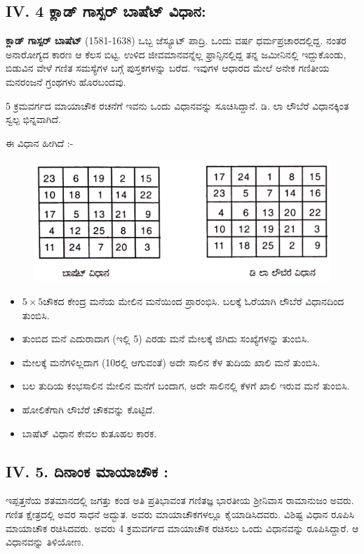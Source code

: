 \subsection{IV. 4 ಕ್ಲಾಡ್ ಗಾಸ್ಪರ್ ಬಾಷೆಟ್ ವಿಧಾನ:}

\textbf{ಕ್ಲಾಡ್ ಗಾಸ್ಪರ್ ಬಾಷೆಟ್} (1581-1638) ಒಬ್ಬ ಜೆಸ್ಯೂಟ್ ಪಾದ್ರಿ. ಒಂದು ವರ್ಷ ಧರ್ಮಪ್ರಚಾರದಲ್ಲಿದ್ದ. ನಂತರ ಅನಾರೋಗ್ಯದ ಕಾರಣ ಆ ಕೆಲಸ ಬಿಟ್ಟ. ಉಳಿದ ಜೀವಮಾನವನ್ನೆಲ್ಲ ಫ್ರಾನ್ಸಿನಲ್ಲಿದ್ದ ತನ್ನ ಜಮೀನಿನಲ್ಲಿ ಇದ್ದುಕೊಂಡು, ಬಿಡುವಿನ ವೇಳೆ ಗಣಿತ ಸಮಸ್ಯೆಗಳ ಬಗ್ಗೆ ಪುಸ್ತಕಗಳನ್ನು ಬರೆದ. ಇವುಗಳ ಆಧಾರದ ಮೇಲೆ ಅನೇಕ ಗಣಿತೀಯ ಮನರಂಜನೆ ಗ್ರಂಥಗಳು ಹೊರಬಂದವು.

5 ಕ್ರಮವರ್ಗದ ಮಾಯಾಚೌಕ ರಚನೆಗೆ ಇವನು ಒಂದು ವಿಧಾನವನ್ನು ಸೂಚಿಸಿದ್ದಾನೆ. ಡಿ. ಲಾ ಲೌಬೆರೆ ವಿಧಾನಕ್ಕಿಂತ ಸ್ವಲ್ಪ ಭಿನ್ನವಾಗಿದೆ.

ಈ ವಿಧಾನ ಹೀಗಿದೆ :-
\begin{figure}[h]
\includegraphics{src/figures/chap3/fig3.43.jpg}
\end{figure}

\begin{itemize}
	\item $5 \times 5$ಚೌಕದ ಕೇಂದ್ರ ಮನೆಯ ಮೇಲಿನ ಮನೆಯಿಂದ ಪ್ರಾರಂಭಿಸಿ. ಬಲಕ್ಕೆ ಓರೆಯಾಗಿ ಲೌಬೆರೆ ವಿಧಾನದಿಂದ ತುಂಬಿಸಿ.
	\item ತುಂಬಿದ ಮನೆ ಎದುರಾದಾಗ (ಇಲ್ಲಿ 5) ಎರಡು ಮನೆ ಮೇಲಕ್ಕೆ ಜಿಗಿದು ಸಂಖ್ಯೆಗಳನ್ನು ತುಂಬಿಸಿ.
	\item ಮೇಲಕ್ಕೆ ಮನೆಗಳಿಲ್ಲದಾಗ (10ರಲ್ಲಿ ಆಗುವಂತೆ) ಅದೇ ಸಾಲಿನ ಕೆಳ ತುದಿಯ ಖಾಲಿ ಮನೆ ತುಂಬಿಸಿ.
	\item ಬಲ ತುದಿಯ ಕಂಭಸಾಲಿನ ಮೇಲಿನ ಮನೆಗೆ ಬಂದಾಗ, ಅದೇ ಸಾಲಿನಲ್ಲಿ ಕೆಳಗೆ ಖಾಲಿ ಇರುವ ಮನೆ ತುಂಬಿಸಿ.
	\item ಹೋಲಿಕೆಗಾಗಿ ಲೌಬೆರೆ ಚೌಕವನ್ನು ಕೊಟ್ಟಿದೆ.
	\item ಬಾಷೆಟ್ ವಿಧಾನ ಕೇವಲ ಕುತೂಹಲ ಕಾರಕ.
\end{itemize}

\subsection{IV. 5. ದಿನಾಂಕ ಮಾಯಾಚೌಕ :}

ಇಪ್ಪತ್ತನೆಯ ಶತಮಾನದಲ್ಲಿ ಜಗತ್ತು ಕಂಡ ಅತಿ ಪ್ರತಿಭಾವಂತ ಗಣಿತಜ್ಞ ಭಾರತೀಯ ಶ್ರೀನಿವಾಸ ರಾಮಾನುಜಂ ಅವರು. ಗಣಿತ ಕ್ಷೇತ್ರದಲ್ಲಿ ಅವರ ಸಾಧನೆ ಅದ್ಭುತ. ಅವರು ಮಾಯಾಚೌಕಗಳಲ್ಲೂ ಕೈಯಾಡಿಸಿದವರು. ವಿಶಿಷ್ಟ ವಿಧಾನ ರೂಪಿಸಿ ಮಾಯಾಚೌಕ ರಚಿಸಿದವರು. ಅವರು 4 ಕ್ರಮವರ್ಗದ ಮಾಯಾಚೌಕ ರಚಿಸಲು ಒಂದು ವಿಧಾನವನ್ನು ರೂಪಿಸಿದ್ದಾರೆ. ಆ ವಿಧಾನವನ್ನು ತಿಳಿಯೋಣ.

